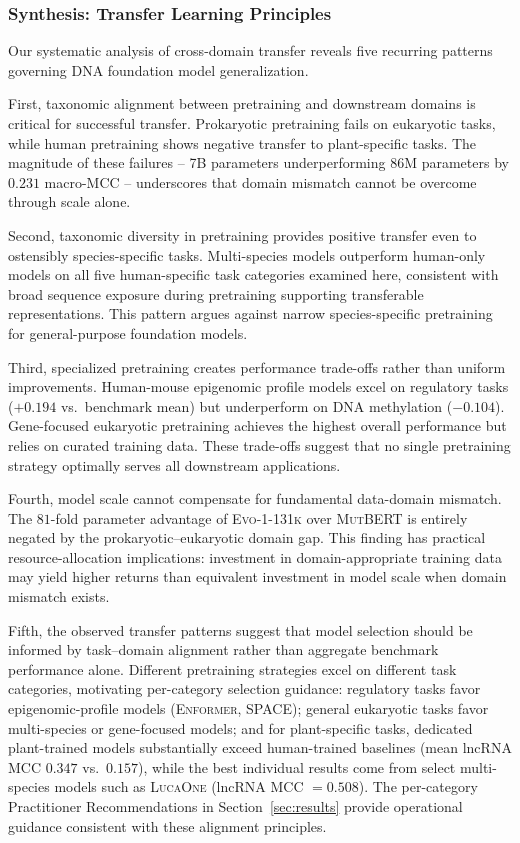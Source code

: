 \documentclass{article}
\theoremstyle{plain}
\theoremstyle{definition}
\theoremstyle{remark}
\begin{document}
\subsubsection{Synthesis: Transfer Learning Principles}

Our systematic analysis of cross-domain transfer reveals five
recurring patterns governing DNA foundation model generalization.

First, taxonomic alignment between pretraining and downstream
domains is critical for successful transfer. Prokaryotic
pretraining fails on eukaryotic tasks, while human pretraining
shows negative transfer to plant-specific tasks. The magnitude of
these failures -- 7B parameters underperforming 86M parameters by
$0.231$ macro-MCC -- underscores that domain mismatch cannot be
overcome through scale alone.

Second, taxonomic diversity in pretraining provides positive
transfer even to ostensibly species-specific tasks. Multi-species
models outperform human-only models on all five human-specific
task categories examined here, consistent with broad sequence
exposure during pretraining supporting transferable
representations. This pattern argues against narrow
species-specific pretraining for general-purpose foundation
models.

Third, specialized pretraining creates performance trade-offs
rather than uniform improvements. Human-mouse epigenomic profile
models excel on regulatory tasks ($+0.194$ vs.\ benchmark mean)
but underperform on DNA methylation ($-0.104$). Gene-focused
eukaryotic pretraining achieves the highest overall performance
but relies on curated training data. These trade-offs suggest that
no single pretraining strategy optimally serves all downstream
applications.

Fourth, model scale cannot compensate for fundamental data-domain
mismatch. The $81$-fold parameter advantage of \textsc{Evo-1-131k}
over \textsc{MutBERT} is entirely negated by the
prokaryotic--eukaryotic domain gap. This finding has practical
resource-allocation implications: investment in domain-appropriate
training data may yield higher returns than equivalent investment
in model scale when domain mismatch exists.

Fifth, the observed transfer patterns suggest that model selection
should be informed by task--domain alignment rather than aggregate
benchmark performance alone. Different pretraining strategies
excel on different task categories, motivating per-category
selection guidance: regulatory tasks favor epigenomic-profile
models (\textsc{Enformer}, \textsc{SPACE}); general eukaryotic
tasks favor multi-species or gene-focused models; and for
plant-specific tasks, dedicated plant-trained models substantially
exceed human-trained baselines (mean lncRNA MCC $0.347$ vs.\
$0.157$), while the best individual results come from select
multi-species models such as \textsc{LucaOne} (lncRNA MCC $=
0.508$). The per-category Practitioner Recommendations in
Section~\ref{sec:results} provide operational guidance consistent
with these alignment principles.
\end{document}
